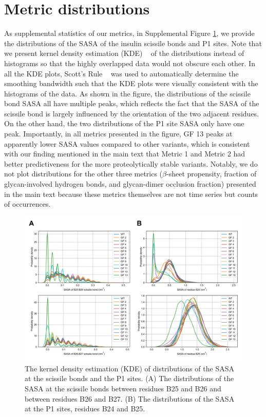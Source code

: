 \documentclass[9pt]{elife}
\begin{document}
\section{Metric distributions}
As supplemental statistics of our metrics, in Supplemental Figure \ref{SASA_distribution}, we provide the distributions of the SASA of the insulin scissile bonds and P1 sites. Note that we present kernel density estimation (KDE) ~\cite{davis2011remarks, parzen1962estimation} of the distributions instead of histograms so that the highly overlapped data would not obscure each other. In all the KDE plots, Scott's Rule ~\cite{scott2015multivariate} was used to automatically determine the smoothing bandwidth such that the KDE plots were visually consistent with the histograms of the data. As shown in the figure, the distributions of the scissile bond SASA all have multiple peaks, which reflects the fact that the SASA of the scissile bond is largely influenced by the orientation of the two adjacent residues. On the other hand, the two distributions of the P1 site SASA only have one peak. Importantly, in all metrics presented in the figure, GF 13 peaks at apparently lower SASA values compared to other variants, which is consistent with our finding mentioned in the main text that Metric 1 and Metric 2 had better predictiveness for the more proteolytically stable variants. Notably, we do not plot distributions for the other three metrics ($\beta$-sheet propensity, fraction of glycan-involved hydrogen bonds, and glycan-dimer occlusion fraction) presented in the main text because these metrics themselves are not time series but counts of occurrences. 

\renewcommand{\thefigure}{S\arabic{figure}}
\begin{figure}[H]
\centering
\includegraphics[width=\textwidth]{Figures/Fig_SASA_distribution.png}
\caption{The kernel density estimation (KDE) of distributions of the SASA at the scissile bonds and the P1 sites. (A) The distributions of the SASA at the scissile bonds between residues B25 and B26 and between residues B26 and B27. (B) The distributions of the SASA at the P1 sites, residues B24 and B25.}
\label{SASA_distribution}
\end{figure}
\end{document}

